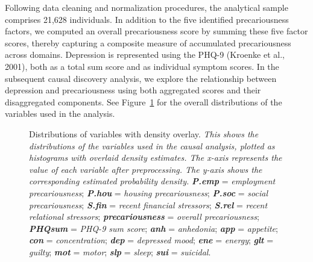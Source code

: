 \documentclass[
]{article}
\begin{document}
Following data cleaning and normalization procedures, the analytical
sample comprises 21,628 individuals. In addition to the five identified
precariousness factors, we computed an overall precariousness score by
summing these five factor scores, thereby capturing a composite measure
of accumulated precariousness across domains. Depression is represented
using the PHQ-9 (Kroenke et al., 2001), both as a total sum score and as
individual symptom scores. In the subsequent causal discovery analysis,
we explore the relationship between depression and precariousness using
both aggregated scores and their disaggregated components. See
Figure~\ref{fig-dist} for the overall distributions of the variables
used in the analysis.

\begin{figure}


\caption{\label{fig-dist}Distributions of variables with density
overlay. \emph{This shows the distributions of the variables used in the
causal analysis, plotted as histograms with overlaid density estimates.
The x-axis represents the value of each variable after preprocessing.
The y-axis shows the corresponding estimated probability density.}
\textbf{\emph{P.emp}} = \emph{employment precariousness};
\textbf{\emph{P.hou}} = \emph{housing precariousness};
\textbf{\emph{P.soc}} = \emph{social precariousness};
\textbf{\emph{S.fin}} = \emph{recent financial stressors};
\textbf{\emph{S.rel}} = \emph{recent relational stressors};
\textbf{\emph{precariousness}} = \emph{overall precariousness};
\textbf{\emph{PHQsum}} = \emph{PHQ-9 sum score}; \textbf{\emph{anh}} =
\emph{anhedonia}; \textbf{\emph{app}} = \emph{appetite};
\textbf{\emph{con}} = \emph{concentration}; \textbf{\emph{dep}} =
\emph{depressed mood}; \textbf{\emph{ene}} = \emph{energy};
\textbf{\emph{glt}} = \emph{guilty}; \textbf{\emph{mot}} = \emph{motor};
\textbf{\emph{slp}} = \emph{sleep}; \textbf{\emph{sui}} =
\emph{suicidal}.}

\end{figure}%
\end{document}
